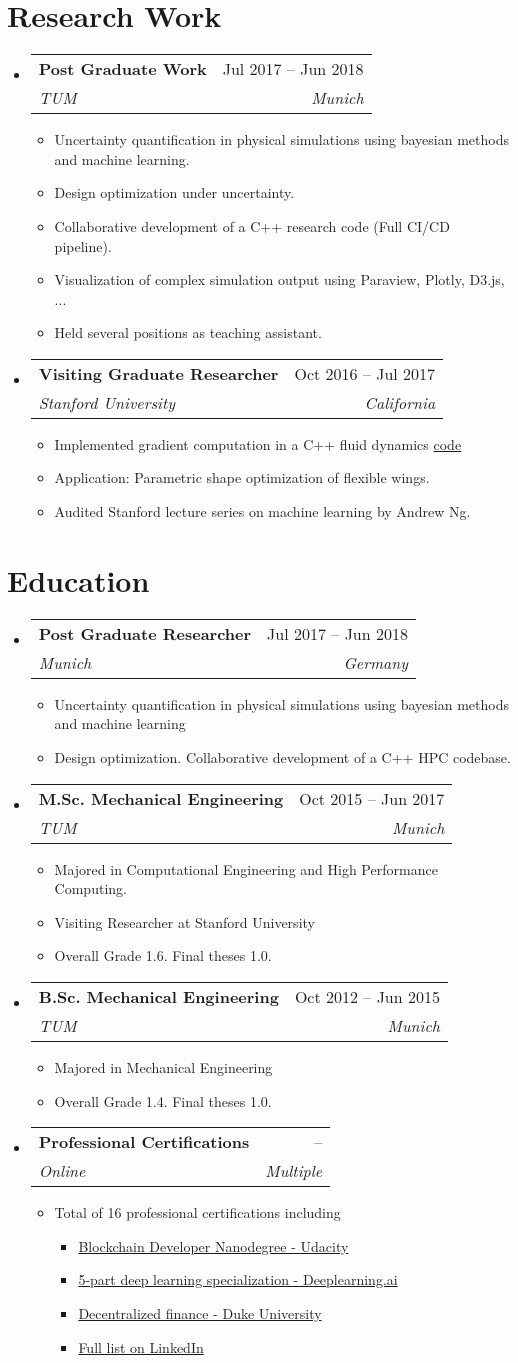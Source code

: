 \documentclass[letterpaper,11pt]{article}
\makeatletter
\newcommand{\resumeItem}[1]{
  \item\small{
    {#1 \vspace{-2pt}}
  }
}
\newcommand{\resumeSubheading}[4]{
  \vspace{-2pt}\item
    \begin{tabular*}{0.97\textwidth}[t]{l@{\extracolsep{\fill}}r}
      \textbf{#1} & #2 \\
      \textit{\small#3} & \textit{\small #4} \\
    \end{tabular*}\vspace{-7pt}
}
\newcommand{\resumeSubHeadingListStart}{\begin{itemize}[leftmargin=0.15in, label={}]}
\newcommand{\resumeSubHeadingListEnd}{\end{itemize}}
\newcommand{\resumeItemListStart}{\begin{itemize}}
\newcommand{\resumeItemListEnd}{\end{itemize}\vspace{-5pt}}
\makeatother
\begin{document}
\section{Research Work}
  \resumeSubHeadingListStart
    \resumeSubheading
      {Post Graduate Work }{Jul 2017 -- Jun 2018}
      {TUM}{Munich}
    \resumeItemListStart
      \resumeItem{Uncertainty quantification in physical simulations using bayesian methods and machine learning.}
      \resumeItem{Design optimization under uncertainty.}
      \resumeItem{Collaborative development of a C++ research code (Full CI/CD pipeline).}
      \resumeItem{Visualization of complex simulation output using Paraview, Plotly, D3.js, ...}
      \resumeItem{Held several positions as teaching assistant.}
    \resumeItemListEnd
    \resumeSubheading
      {Visiting Graduate Researcher }{Oct 2016 -- Jul 2017}
      {Stanford University}{California}
    \resumeItemListStart
      \resumeItem{Implemented gradient computation in a C++ fluid dynamics \href{https://bitbucket.org/frg/aero-f/src/master/}{code}}
      \resumeItem{Application: Parametric shape optimization of flexible wings.}
      \resumeItem{Audited Stanford lecture series on machine learning by Andrew Ng.}
    \resumeItemListEnd
  \resumeSubHeadingListEnd

\section{Education}
  \resumeSubHeadingListStart
    \resumeSubheading
      {Post Graduate Researcher }{Jul 2017 -- Jun 2018}
      {Munich}{Germany}
    \resumeItemListStart
      \resumeItem{Uncertainty quantification in physical simulations using bayesian methods and machine learning}
      \resumeItem{Design optimization. Collaborative development of a C++ HPC codebase.}
    \resumeItemListEnd
    \resumeSubheading
      {M.Sc. Mechanical Engineering }{Oct 2015 -- Jun 2017}
      {TUM}{Munich}
    \resumeItemListStart
      \resumeItem{Majored in Computational Engineering and High Performance Computing.}
      \resumeItem{Visiting Researcher at Stanford University}
      \resumeItem{Overall Grade 1.6. Final theses 1.0.}
    \resumeItemListEnd
    \resumeSubheading
      {B.Sc. Mechanical Engineering }{Oct 2012 -- Jun 2015}
      {TUM}{Munich}
    \resumeItemListStart
      \resumeItem{Majored in Mechanical Engineering}
      \resumeItem{Overall Grade 1.4. Final theses 1.0.}
    \resumeItemListEnd
    \resumeSubheading
      {Professional Certifications }{ -- }
      {Online}{Multiple}
    \resumeItemListStart
      \resumeItem{Total of 16 professional certifications including}
      \resumeItemListStart
        \resumeItem{\href{https://confirm.udacity.com/PRDLGCYP}{Blockchain Developer Nanodegree - Udacity}}
        \resumeItem{\href{https://coursera.org/share/ec095b18337aecea2c101552eeb97dd3}{5-part deep learning specialization -  Deeplearning.ai}}
        \resumeItem{\href{https://coursera.org/share/0be4aacea173ecab67e917e79c1ae954}{Decentralized finance - Duke University}}
        \resumeItem{\href{https://www.linkedin.com/in/scheuclu}{Full list on LinkedIn}}
      \resumeItemListEnd
    \resumeItemListEnd
  \resumeSubHeadingListEnd
\end{document}
